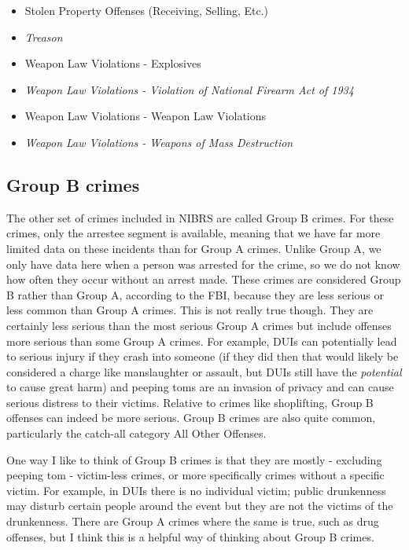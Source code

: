 \documentclass[
]{krantz}
\begin{document}
\begin{itemize}
\item
  Stolen Property Offenses (Receiving, Selling, Etc.)\\
\item
  \emph{Treason}
\item
  Weapon Law Violations - Explosives\\
\item
  \emph{Weapon Law Violations - Violation of National
  Firearm Act of 1934}\\
\item
  Weapon Law Violations - Weapon Law Violations
\item
  \emph{Weapon Law Violations - Weapons of Mass Destruction}
\end{itemize}

\subsection{Group B crimes}\label{group-b-crimes}

The other set of crimes included in NIBRS are called Group B
crimes. For these crimes, only the arrestee segment is
available, meaning that we have far more limited data on
these incidents than for Group A crimes. Unlike Group A, we
only have data here when a person was arrested for the
crime, so we do not know how often they occur without an
arrest made. These crimes are considered Group B rather than
Group A, according to the FBI, because they are less serious
or less common than Group A crimes. This is not really true
though. They are certainly less serious than the most
serious Group A crimes but include offenses more serious
than some Group A crimes. For example, DUIs can potentially
lead to serious injury if they crash into someone (if they
did then that would likely be considered a charge like
manslaughter or assault, but DUIs still have the
\emph{potential} to cause great harm) and peeping toms are
an invasion of privacy and can cause serious distress to
their victims. Relative to crimes like shoplifting, Group B
offenses can indeed be more serious. Group B crimes are also
quite common, particularly the catch-all category All Other
Offenses.

One way I like to think of Group B crimes is that they are
mostly - excluding peeping tom - victim-less crimes, or more
specifically crimes without a specific victim. For example,
in DUIs there is no individual victim; public drunkenness
may disturb certain people around the event but they are not
the victims of the drunkenness. There are Group A crimes
where the same is true, such as drug offenses, but I think
this is a helpful way of thinking about Group B crimes.
\end{document}
